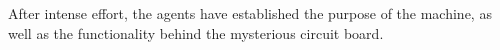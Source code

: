 After intense effort, the agents have established the purpose of the machine, as well as the functionality behind the mysterious circuit board.



